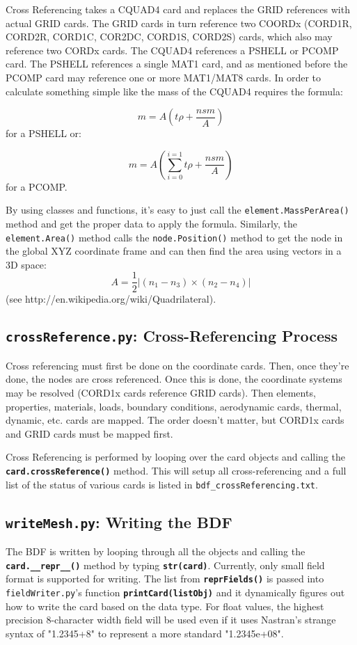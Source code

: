      Cross Referencing takes a CQUAD4 card and replaces the GRID references with actual GRID cards.  The GRID cards in turn reference two COORDx (CORD1R, CORD2R, CORD1C, COR2DC, CORD1S, CORD2S) cards, which also may reference two CORDx cards.  The CQUAD4 references a PSHELL or PCOMP card.  The PSHELL references a single MAT1 card, and as mentioned before the PCOMP card may reference one or more MAT1/MAT8 cards.  In order to calculate something simple like the mass of the CQUAD4 requires the formula:
     
     {\begin{equation} m=A \left( t\rho + \frac{nsm}{A} \right) \end{equation} } for a PSHELL or:

     {\begin{equation} m=A \left( \sum_{i=0}^{i=1}{t\rho} + \frac{nsm}{A} \right)  \end{equation} } for a PCOMP.
     

     By using classes and functions, it's easy to just call the {\tt element.MassPerArea()} method and get the proper data to apply the formula.  Similarly, the {\tt element.Area()} method calls the {\tt node.Position()} method to get the node in the global XYZ coordinate frame and can then find the area using vectors in a 3D space:
     {\begin{equation} A=\frac{1}{2} | (n_1-n_3) \times (n_2-n_4) | \end{equation} }
     (see http://en.wikipedia.org/wiki/Quadrilateral).
 
 
 \subsection{{\tt crossReference.py}: Cross-Referencing Process}
     Cross referencing must first be done on the coordinate cards.  Then, once they're done, the nodes are cross referenced.  Once this is done, the coordinate systems may be resolved (CORD1x cards reference GRID cards).  Then elements, properties, materials, loads, boundary conditions, aerodynamic cards, thermal, dynamic, etc. cards are mapped.  The order doesn't matter, but CORD1x cards and GRID cards must be mapped first.
     
     Cross Referencing is performed by looping over the card objects and calling the {\bf \tt card.crossReference()} method.  This will setup all cross-referencing and a full list of the status of various cards is listed in {\tt bdf\_crossReferencing.txt}.

 \subsection{{\tt writeMesh.py}: Writing the BDF}
     The BDF is written by looping through all the objects and calling the {\bf \tt card.\_\_repr\_\_()} method by typing {\bf \tt str(card)}.
     Currently, only small field format is supported for writing.  The list from {\bf \tt reprFields()} is passed into {\tt fieldWriter.py}'s function {\bf \tt printCard(listObj)} and it dynamically figures out how to write the card based on the data type.  For float values, the highest precision 8-character width field will be used even if it uses Nastran's strange syntax of "1.2345+8" to represent a more standard "1.2345e+08".